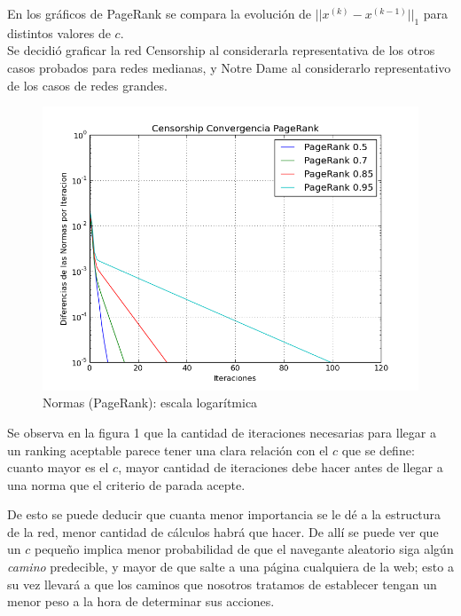 \documentclass[a4paper]{article}
\begin{document}
En los gráficos de PageRank se compara la evolución de $||x^{(k)}-x^{(k-1)}||_1$ para distintos valores de $c$.\\
Se decidió graficar la red Censorship al considerarla representativa de los otros casos probados para redes medianas, y Notre Dame al considerarlo representativo de los casos de redes grandes.

\begin{figure}[htbp]
\centering

\includegraphics[scale=0.4]{img/Normas-Page-Censor.png} 

\caption{Normas (PageRank): escala logarítmica}
\end{figure}

Se observa en la figura 1 que la cantidad de iteraciones necesarias para llegar a un ranking aceptable parece tener una clara relación con el $c$ que se define: cuanto mayor es el $c$, mayor cantidad de iteraciones debe hacer antes de llegar a una norma que el criterio de parada acepte.

De esto se puede deducir que cuanta menor importancia se le dé a la estructura de la red, menor cantidad de cálculos habrá que hacer. De allí se puede ver que un $c$ pequeño implica menor probabilidad de que el navegante aleatorio siga algún \textit{camino} predecible, y mayor de que salte a una página cualquiera de la web; esto a su vez llevará a que los caminos que nosotros tratamos de establecer tengan un menor peso a la hora de determinar sus acciones. \newline
\end{document}
